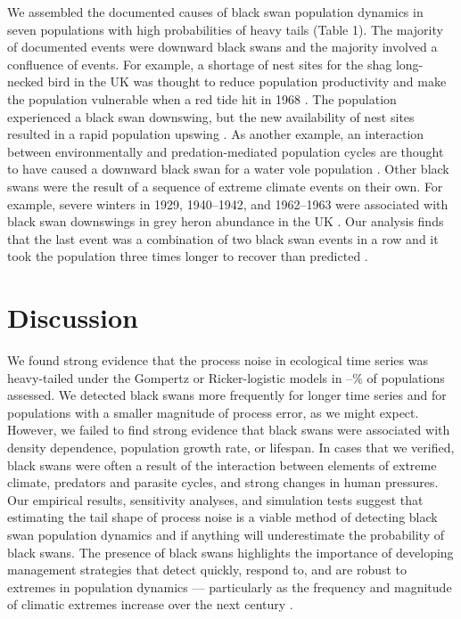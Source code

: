 We assembled the documented causes of black swan population dynamics in seven
populations with high probabilities of heavy tails (Table 1). The majority of
documented events were downward black swans and the majority involved
a confluence of events. For example, a shortage of nest sites for the shag
long-necked bird in the UK was thought to reduce population productivity and
make the population vulnerable when a red tide hit in 1968 \citep{potts1980}.
The population experienced a black swan downswing, but the new availability of
nest sites resulted in a rapid population upswing \citep{potts1980}. As
another example, an interaction between environmentally and predation-mediated
population cycles are thought to have caused a downward black swan for a water
vole population \citep{saucy1994}. Other black swans were the result of
a sequence of extreme climate events on their own. For example, severe winters
in 1929, 1940--1942, and 1962--1963 were associated with black swan downswings
in grey heron abundance in the UK \citep{stafford1971}. Our analysis finds
that the last event was a combination of two black swan events in a row and it
took the population three times longer to recover than predicted
\citep{stafford1971}.

\section{Discussion}

We found strong evidence that the process noise in ecological time series was heavy-tailed under the Gompertz or Ricker-logistic models in \overallMinPerc--\overallMaxPerc\%
of populations assessed. We detected black swans more frequently for longer
time series and for populations with a smaller magnitude of process error, as
we might expect. However, we failed to find strong evidence that black swans
were associated with density dependence, population growth rate, or lifespan.
In cases that we verified, black swans were often a result of the interaction
between elements of extreme climate, predators and parasite cycles, and strong
changes in human pressures. Our empirical results, sensitivity analyses, and
simulation tests suggest that estimating the tail shape of process noise is
a viable method of detecting black swan population dynamics and if anything
will underestimate the probability of black swans. The presence of black swans
highlights the importance of developing management strategies that detect
quickly, respond to, and are robust to extremes in population dynamics ---
particularly as the frequency and magnitude of climatic extremes increase over
the next century \citep{easterling2000,ipcc2012}.

